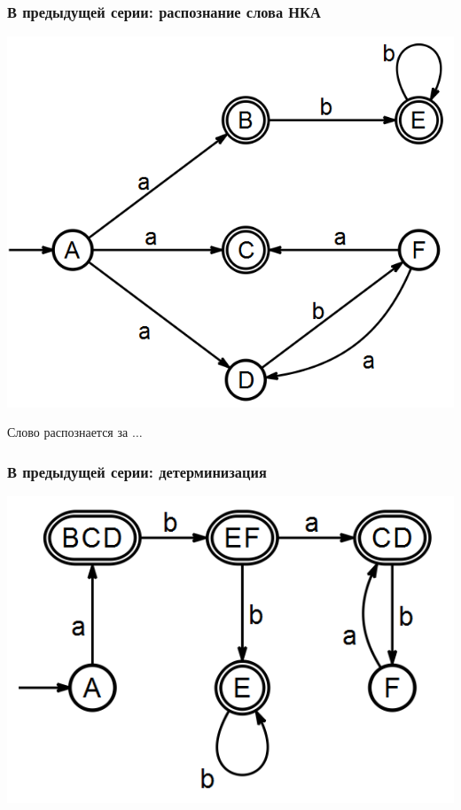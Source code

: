 \documentclass{beamer}
\begin{document}
\begin{frame}[fragile]
  \transwipe[direction=90]
  \frametitle{В предыдущей серии: распознание слова НКА}
  \begin{center}
  \includegraphics[height=0.75\textheight]{pics/2exdet.png}  
  \end{center}

  Слово распознается за $\dots$
\end{frame}

\begin{frame}[fragile]
  \transwipe[direction=90]
  \frametitle{В предыдущей серии: детерминизация}
  \begin{center}
  \includegraphics[height=0.75\textheight]{pics/2exdetres.png}  
  \end{center}

\end{frame}
\end{document}
